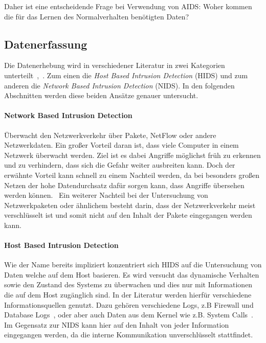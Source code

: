                 Daher ist eine entscheidende Frage bei Verwendung von AIDS\@: Woher kommen die für das Lernen des Normalverhalten benötigten Daten?

        \subsection{Datenerfassung}
        \label{sec:Datenerfassung}

            Die Datenerhebung wird in verschiedener Literatur in zwei Kategorien unterteilt~\cite{IDSsurvey},~\cite{IDSreview}.
            Zum einen die \textit{Host Based Intrusion Detection} (HIDS) und zum anderen die \textit{Network Based Intrusion Detection} (NIDS).
            In den folgenden Abschnitten werden diese beiden Ansätze genauer untersucht.

            \paragraph{Network Based Intrusion Detection}
                Überwacht den Netzwerkverkehr über Pakete, NetFlow oder andere Netzwerkdaten.
                Ein großer Vorteil daran ist, dass viele Computer in einem Netzwerk überwacht werden.
                Ziel ist es dabei Angriffe möglichst früh zu erkennen und zu verhindern, dass sich die Gefahr weiter ausbreiten kann.
                Doch der erwähnte Vorteil kann schnell zu einem Nachteil werden,
                da bei besonders großen Netzen der hohe Datendurchsatz dafür sorgen kann, dass Angriffe übersehen werden können.~\cite{NIDS}
                Ein weiterer Nachteil bei der Untersuchung von Netzwerkpaketen oder ähnlichem besteht darin, dass der Netzwerkverkehr meist verschlüsselt ist
                und somit nicht auf den Inhalt der Pakete eingegangen werden kann.

            \paragraph{Host Based Intrusion Detection}
                Wie der Name bereits impliziert konzentriert sich HIDS auf die Untersuchung von Daten welche auf dem Host basieren.
                Es wird versucht das dynamische Verhalten sowie den Zustand des Systems zu überwachen und dies nur mit Informationen die auf dem Host zugänglich sind.
                In der Literatur werden hierfür verschiedene Informationsquellen genutzt.
                Dazu gehören verschiedene Logs, z.B Firewall und Database Logs~\cite{IDSsurvey}, oder aber auch Daten aus dem Kernel wie z.B. System Calls~\cite{MAGGI}.
                Im Gegensatz zur NIDS kann hier auf den Inhalt von jeder Information eingegangen werden, da die interne Kommunikation unverschlüsselt stattfindet. 


